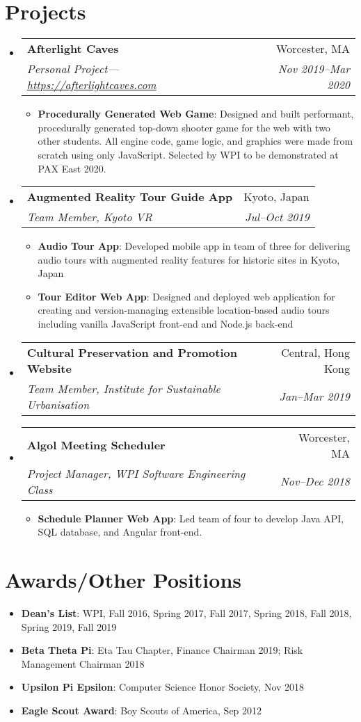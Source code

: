 \documentclass[letterpaper,11pt]{article}
\makeatletter
\newcommand{\resumeItem}[2]{
  \item\small{
    \textbf{#1}{: #2 \vspace{-2pt}}
  }
}
\newcommand{\resumeSubheading}[4]{
  \vspace{-1pt}\item
    \begin{tabular*}{0.97\textwidth}{l@{\extracolsep{\fill}}r}
      \textbf{#1} & #2 \\
      \textit{\small#3} & \textit{\small #4} \\
    \end{tabular*}\vspace{-5pt}
}
\newcommand{\resumeSubItem}[2]{\resumeItem{#1}{#2}\vspace{-4pt}}
\newcommand{\resumeSubHeadingListStart}{\begin{itemize}[leftmargin=*]}
\newcommand{\resumeSubHeadingListEnd}{\end{itemize}}
\newcommand{\resumeItemListStart}{\begin{itemize}}
\newcommand{\resumeItemListEnd}{\end{itemize}\vspace{-5pt}}
\makeatother
\begin{document}
\section{Projects}
\resumeSubHeadingListStart
  \resumeSubheading
    {Afterlight Caves}{Worcester, MA}
	{Personal Project---\url{https://afterlightcaves.com}}{Nov 2019--Mar 2020}
	\resumeItemListStart
	\resumeItem{Procedurally Generated Web Game}{Designed and built
		performant, procedurally generated top-down shooter game for the web
		with two other students. All engine code, game logic, and graphics were
		made from scratch using only JavaScript. Selected by WPI to be
		demonstrated at PAX East 2020.}
	\resumeItemListEnd
    \resumeSubheading
	{Augmented Reality Tour Guide App}{Kyoto, Japan}
	{Team Member, Kyoto VR}{Jul--Oct 2019}
	\resumeItemListStart
	  \resumeItem{Audio Tour App}{Developed mobile app in team of three for
		  delivering audio tours with augmented reality features for historic
		  sites in Kyoto, Japan}
	  \resumeItem{Tour Editor Web App}{Designed and deployed web application for
		  creating and version-managing extensible location-based audio tours
		  including vanilla JavaScript front-end and Node.js back-end}
	\resumeItemListEnd

    \resumeSubheading
	{Cultural Preservation and Promotion Website}{Central, Hong Kong}
    {Team Member, Institute for Sustainable Urbanisation}{Jan--Mar 2019}

    \resumeSubheading
	{Algol Meeting Scheduler}{Worcester, MA}
	{Project Manager, WPI Software Engineering Class}{Nov--Dec 2018}
	\resumeItemListStart
	\resumeItem{Schedule Planner Web App}{Led team of four to develop Java API,
		SQL database, and Angular front-end.}
	\resumeItemListEnd
  \resumeSubHeadingListEnd



\section{Awards/Other Positions}
  \resumeSubHeadingListStart
    \resumeSubItem{Dean's List}
      {WPI, Fall 2016, Spring 2017, Fall 2017, Spring 2018, Fall 2018, Spring
		  2019, Fall 2019}
    \resumeSubItem{Beta Theta Pi}
	  {Eta Tau Chapter, Finance Chairman 2019; Risk Management Chairman
		  2018}
    \resumeSubItem{Upsilon Pi Epsilon}
      {Computer Science Honor Society, Nov 2018}
    \resumeSubItem{Eagle Scout Award}
      {Boy Scouts of America, Sep 2012}
  \resumeSubHeadingListEnd

\end{document}
